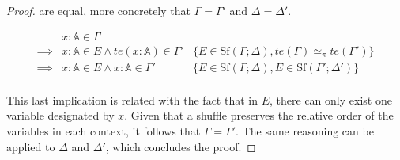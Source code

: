 \documentclass[10pt,a4paper]{amsart}
\theoremstyle{definition}
\theoremstyle{definition}
\theoremstyle{definition}
\theoremstyle{definition}
\theoremstyle{definition}
\theoremstyle{definition}
\begin{document}
\begin{proof}
are equal, more concretely that $\Gamma = \Gamma'$ and $\Delta = \Delta'$. 

\begin{align*}
  & x: \mathbb{A}  \in \Gamma & \\
  \implies & x: \mathbb{A}  \in E \land   te(x:\mathbb{A}) \in \Gamma'  & \{E \in \text{Sf}(\Gamma;\Delta), te(\Gamma) \simeq_{\pi}  te(\Gamma') \} \\
  \implies & x: \mathbb{A}  \in E \land  x:\mathbb{A} \in \Gamma'  & \{ E \in \text{Sf}(\Gamma;\Delta),E \in \text{Sf}(\Gamma';\Delta') \} \\
\end{align*}

This last implication is related with the fact that in $E$, there can only exist one  variable designated by $x$. Given that a shuffle preserves the relative order of the variables in each context, it follows that $\Gamma = \Gamma'$. The same reasoning can be applied to $\Delta$ and $\Delta'$, which concludes the proof. 


  \end{proof}

 

\end{document}

